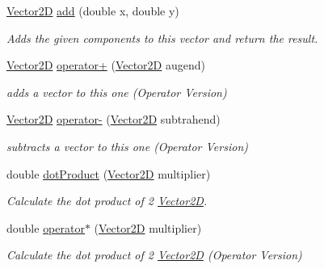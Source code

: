 \begin{DoxyCompactItemize}
\hyperlink{class_j118_1_1_math_1_1_vector2_d}{Vector2\+D} \hyperlink{class_j118_1_1_math_1_1_vector2_d_ab397cfc5098900c169ca5b2e241c5384}{add} (double x, double y)
\begin{DoxyCompactList}\small\item\em Adds the given components to this vector and return the result. \end{DoxyCompactList}\item 
\hyperlink{class_j118_1_1_math_1_1_vector2_d}{Vector2\+D} \hyperlink{class_j118_1_1_math_1_1_vector2_d_a13a3fb9bbc4a7d3fd00c5e0c4d8ebddb}{operator+} (\hyperlink{class_j118_1_1_math_1_1_vector2_d}{Vector2\+D} augend)
\begin{DoxyCompactList}\small\item\em adds a vector to this one (Operator Version) \end{DoxyCompactList}\item 
\hyperlink{class_j118_1_1_math_1_1_vector2_d}{Vector2\+D} \hyperlink{class_j118_1_1_math_1_1_vector2_d_a28749361a623b6f16ec5308085f6d164}{operator-\/} (\hyperlink{class_j118_1_1_math_1_1_vector2_d}{Vector2\+D} subtrahend)
\begin{DoxyCompactList}\small\item\em subtracts a vector to this one (Operator Version) \end{DoxyCompactList}\item 
double \hyperlink{class_j118_1_1_math_1_1_vector2_d_a0e8821906e15fd30d245ed0e9b7b1758}{dot\+Product} (\hyperlink{class_j118_1_1_math_1_1_vector2_d}{Vector2\+D} multiplier)
\begin{DoxyCompactList}\small\item\em Calculate the dot product of 2 \hyperlink{class_j118_1_1_math_1_1_vector2_d}{Vector2\+D}. \end{DoxyCompactList}\item 
double \hyperlink{class_j118_1_1_math_1_1_vector2_d_a1de08c41ec31eda4a11e5c080f83c89f}{operator$\ast$} (\hyperlink{class_j118_1_1_math_1_1_vector2_d}{Vector2\+D} multiplier)
\begin{DoxyCompactList}\small\item\em Calculate the dot product of 2 \hyperlink{class_j118_1_1_math_1_1_vector2_d}{Vector2\+D} (Operator Version) \end{DoxyCompactList}\end{DoxyCompactItemize}
